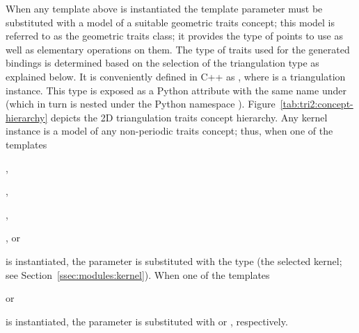 When any template above is instantiated the template parameter  must be substituted with a model of a suitable geometric traits concept; this model is referred to as the geometric traits class; it provides the type of points to use as well as elementary operations on them. The type of traits used for the generated bindings is determined based on the selection of the triangulation type as explained below. It is conveniently defined in C++ as , where  is a triangulation instance. This type is exposed as a Python attribute with the same name under  (which in turn is nested under the Python namespace ). Figure~\ref{tab:tri2:concept-hierarchy} depicts the 2D triangulation traits concept hierarchy. Any kernel instance is a model of any non-periodic traits concept; thus, when one of the templates
\begin{compactenum}
\item {},
\item {},
\item {},
\item {}, or
\item {}
\end{compactenum}
is instantiated, the  parameter is substituted
with the  type (the selected kernel; see
Section~\ref{ssec:modules:kernel}). When one of the templates
\begin{compactenum}
\item {} or
\item {}
\end{compactenum}
is instantiated, the  parameter is substituted with  or , respectively.
